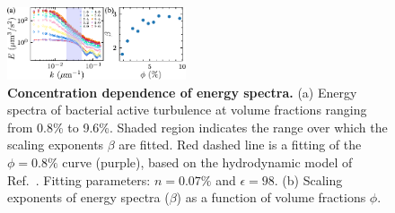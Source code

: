 \documentclass[twocolumn,aps,prl,amsmath,amssymb,longbibliography]{revtex4-2}
\begin{document}
\begin{figure}[!]
\begin{center}
\includegraphics[width=0.47\textwidth]{figures/energy-spectra/v1.pdf}
\caption[Concentration dependence of energy spectra.]
{
\textbf{Concentration dependence of energy spectra.}
(a) Energy spectra of bacterial active turbulence at volume fractions ranging from 0.8\% to 9.6\%. Shaded region indicates the range over which the scaling exponents $\beta$ are fitted. Red dashed line is a fitting of the $\phi=0.8\%$ curve (purple), based on the hydrodynamic model of Ref.~\cite{Bardfalvy2019}. Fitting parameters: $n=0.07\%$ and $\epsilon=98$.
(b) Scaling exponents of energy spectra ($\beta$) as a function of volume fractions $\phi$.
}
\label{fig:energy-spectra}
\end{center}
\end{figure}
\end{document}
